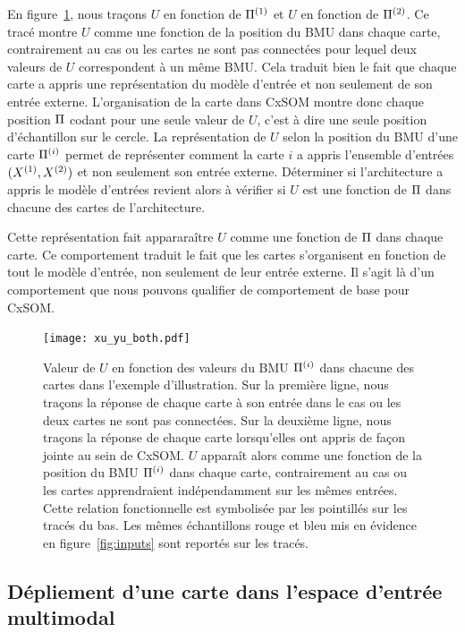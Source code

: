 \documentclass[../main]{subfiles}
\begin{document}
En figure~\ref{fig:piu}, nous traçons $U$ en fonction de $\Pi^{({1})}$ et $U$ en fonction de $\Pi^{({2})}$.
Ce tracé montre $U$ comme une fonction de la position du BMU dans chaque carte, contrairement au cas ou les cartes ne sont pas connectées pour lequel deux valeurs de $U$ correspondent à un même BMU. Cela traduit bien le fait que chaque carte a appris une représentation du modèle d'entrée et non seulement de son entrée externe.
L'organisation de la carte dans CxSOM montre donc chaque position $\Pi$ codant pour une seule valeur de $U$, c'est à dire une seule position d'échantillon sur le cercle.
La représentation de $U$ selon la position du BMU d'une carte $\Pi^{({i})}$ permet de représenter comment la carte $i$ a appris l'ensemble d'entrées $(X^{({1})},X^{({2})})$ et non seulement son entrée externe. Déterminer si l'architecture a appris le modèle d'entrées revient alors à vérifier si $U$ est une fonction de $\Pi$ dans chacune des cartes de l'architecture.

Cette représentation fait appararaître $U$ comme une fonction de $\Pi$ dans chaque carte. Ce comportement traduit le fait que les cartes s'organisent en fonction de tout le modèle d'entrée, non seulement de leur entrée externe. Il s'agit là d'un comportement que nous pouvons qualifier de comportement de base pour CxSOM. 

\begin{figure}
\centering
\texttt{[image: xu\_yu\_both.pdf]}
\caption{Valeur de $U$ en fonction des valeurs du BMU $\Pi^{({i})}$ dans chacune des cartes dans l'exemple d'illustration. Sur la première ligne, nous traçons la réponse de chaque carte à son entrée dans le cas ou les deux cartes ne sont pas connectées. Sur la deuxième ligne, nous traçons la réponse de chaque carte lorsqu'elles ont appris de façon jointe au sein de CxSOM.
$U$ apparaît alors comme une fonction de la position du BMU $\Pi^{({i})}$ dans chaque carte, contrairement au cas ou les cartes apprendraient indépendamment sur les mêmes entrées. Cette relation fonctionnelle est symbolisée par les pointillés sur les tracés du bas. Les mêmes échantillons rouge et bleu mis en évidence en figure~\ref{fig:inputs} sont reportés sur les tracés.}
\label{fig:piu}
\end{figure}


\subsection{Dépliement d'une carte dans l'espace d'entrée multimodal}
\end{document}
